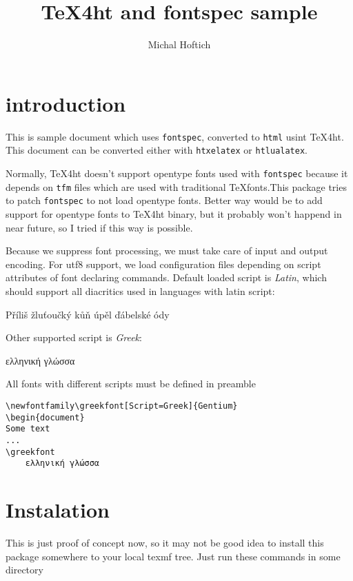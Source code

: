 \documentclass{article}
\newcommand\greekfont{}
\begin{document}
	\title{TeX4ht and fontspec sample}
	\author{Michal Hoftich}
	\maketitle
	\section{introduction}

	This is sample document which uses \texttt{fontspec}, converted to 
	\verb|html| usint \TeX 4ht. This document can be converted either with 
	\verb|htxelatex| or \verb|htlualatex|. 

	Normally, \TeX 4ht doesn't support opentype fonts used with 
	\verb|fontspec| because it depends on \verb|tfm| files which are 
	used with traditional \TeX fonts.This package tries to patch 
	\verb|fontspec| to not load opentype fonts. 
	Better way would be to add support for opentype fonts to 
	\TeX 4ht binary, but it probably won't happend in near future, 
	so I tried if this way is possible.

	Because we suppress font processing, we must take care of input 
	and output encoding. For utf8 support, we load configuration files 
	depending on script attributes of font declaring commands. 
	Default loaded script is \emph{Latin}, which should support all diacritics 
	used in languages with latin script:

	Příliš žluťoučký kůň úpěl ďábelské ódy

	Other supported script is \emph{Greek}:

	\greekfont
	ελληνική γλώσσα

	All fonts with different scripts must be defined in preamble

	\begin{verbatim}
\newfontfamily\greekfont[Script=Greek]{Gentium}
\begin{document}
Some text
...
\greekfont
	ελληνική γλώσσα
	\end{verbatim} 
	\section{Instalation}

	This is just proof of concept now, so it may not be good idea 
	to install this package somewhere to your local texmf tree. 
	Just run these commands in some directory
\end{document}
